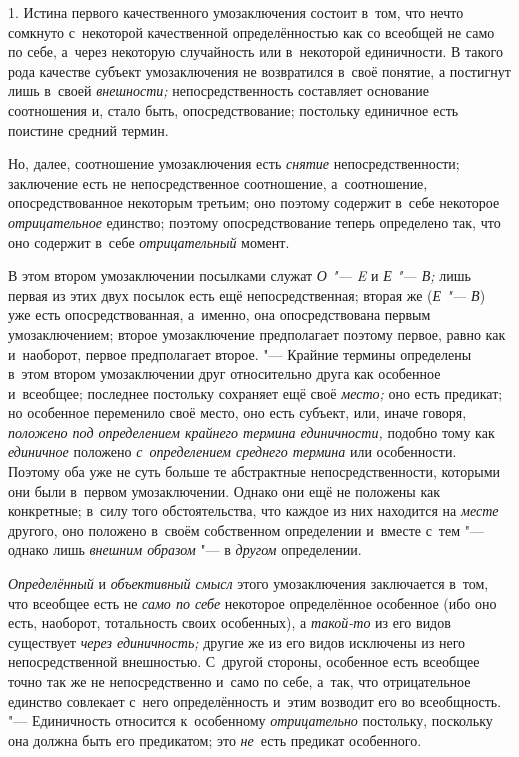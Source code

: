 1. Истина первого качественного умозаключения состоит в~том,
что нечто сомкнуто с~некоторой качественной определённостью как со всеобщей
не само по себе, а~через некоторую случайность или в~некоторой единичности.
В такого рода качестве субъект умозаключения не возвратился в~своё понятие,
а постигнут лишь в~своей {\em внешности;}
непосредственность составляет основание соотношения и, стало
быть, опосредствование; постольку единичное есть поистине средний термин.

Но, далее, соотношение умозаключения есть {\em снятие}
непосредственности; заключение есть не непосредственное
соотношение, а~соотношение, опосредствованное некоторым третьим; оно
поэтому содержит в~себе некоторое {\em отрицательное}
единство; поэтому опосредствование теперь определено так, что
оно содержит в~себе {\em отрицательный} момент.

В этом втором умозаключении посылками служат {\em О "--- E} и {\em Е "--- В;}
лишь первая из этих двух посылок есть ещё непосредственная; вторая же
({\em Е "--- В}) уже есть опосредствованная, а~именно, она опосредствована
первым умозаключением; второе умозаключение предполагает поэтому первое,
равно как и~наоборот, первое предполагает второе. "--- Крайние
термины определены в~этом втором умозаключении друг относительно друга как
особенное и~всеобщее; последнее постольку сохраняет ещё своё {\em место;}
оно есть предикат; но особенное переменило своё место, оно есть субъект,
или, иначе говоря, {\em положено под определением
крайнего термина единичности,} подобно тому как
{\em единичное} положено {\em с~определением среднего термина}
или особенности. Поэтому оба уже не суть больше те
абстрактные непосредственности, которыми они были в~первом умозаключении.
Однако они ещё не положены как конкретные; в~силу того обстоятельства, что
каждое из них находится на {\em месте} другого, оно положено в~своём
собственном определении и~вместе с~тем "--- однако лишь
{\em внешним образом} "--- в {\em другом} определении.

{\em Определённый} и {\em объективный смысл}
этого умозаключения заключается в~том, что всеобщее есть не
{\em само по себе} некоторое определённое особенное (ибо оно есть, наоборот,
тотальность своих особенных), а {\em такой-то} из его видов существует
{\em через единичность;} другие же из его видов исключены из него
непосредственной внешностью. С~другой стороны, особенное есть всеобщее
точно так же не непосредственно и~само по себе, а~так, что отрицательное
единство совлекает с~него определённость и~этим возводит его во
всеобщность. "--- Единичность относится к~особенному {\em отрицательно}
постольку, поскольку она должна быть его предикатом; это
{\em не}~есть предикат особенного.

